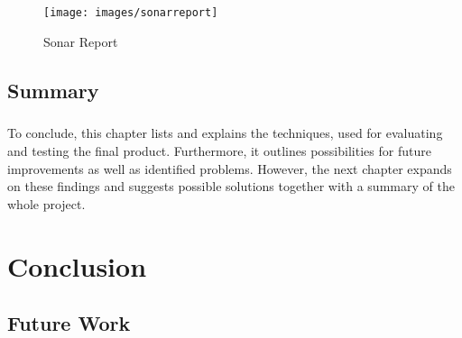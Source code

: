 \documentclass{l4proj}
\begin{document}
\begin{figure}[H]
	\centering
	\texttt{[image: images/sonarreport]}
	\label{fig:sonarreport}
	\caption{Sonar Report}
\end{figure}

\section{Summary}
\paragraph{}
To conclude, this chapter lists and explains the techniques, used for evaluating and testing the final product. Furthermore, it outlines possibilities for future improvements as well as identified problems. However, the next chapter expands on these findings and suggests possible solutions together with a summary of the whole project. 

\chapter{Conclusion}

\section{Future Work}
\end{document}
